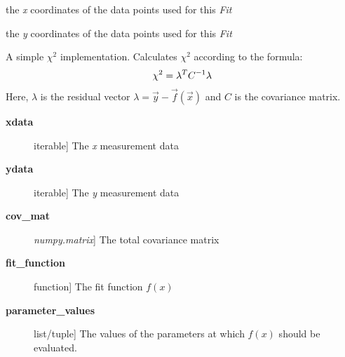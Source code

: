 \documentclass[a4paper,10pt,english]{sphinxmanual}
\begin{document}
\begin{fulllineitems}
\begin{fulllineitems}
\begin{description}
\end{description}

\end{fulllineitems}


\begin{fulllineitems}
\label{index:kafe.fit.Fit.xdata}
the \emph{x} coordinates of the data points used for this \emph{Fit}

\end{fulllineitems}


\begin{fulllineitems}
\label{index:kafe.fit.Fit.ydata}
the \emph{y} coordinates of the data points used for this \emph{Fit}

\end{fulllineitems}


\end{fulllineitems}


\begin{fulllineitems}
\label{index:kafe.fit.chi2}
A simple $\chi^2$ implementation. Calculates $\chi^2$ according
to the formula:
\begin{gather}
\begin{split}\chi^2 = \lambda^T C^{-1} \lambda\end{split}\notag
\end{gather}
Here, $\lambda$ is the residual vector $\lambda = \vec{y} -
\vec{f}(\vec{x})$ and $C$ is the covariance matrix.
\begin{description}
\item[{\textbf{xdata}}] \leavevmode{[}iterable{]}
The \emph{x} measurement data

\item[{\textbf{ydata}}] \leavevmode{[}iterable{]}
The \emph{y} measurement data

\item[{\textbf{cov\_mat}}] \leavevmode{[}\emph{numpy.matrix}{]}
The total covariance matrix

\item[{\textbf{fit\_function}}] \leavevmode{[}function{]}
The fit function $f(x)$

\item[{\textbf{parameter\_values}}] \leavevmode{[}list/tuple{]}
The values of the parameters at which $f(x)$ should be evaluated.

\end{description}

\end{fulllineitems}
\end{document}
